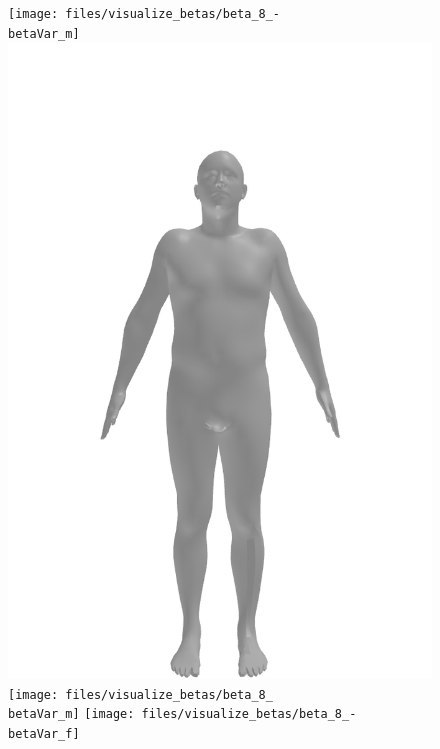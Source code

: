\begin{figure}[ht!]
    \centering

    \begin{minipage}[b]{\textwidth}
        \centering
        \texttt{[image: files/visualize\_betas/beta\_8\_-\\betaVar\_m]}
        \includegraphics[width=\imgWidth]{files/visualize_betas/baseline_m}
        \texttt{[image: files/visualize\_betas/beta\_8\_\\betaVar\_m]}
        \linebreak
        \texttt{[image: files/visualize\_betas/beta\_8\_-\\betaVar\_f]}

\end{minipage}
\end{figure}
